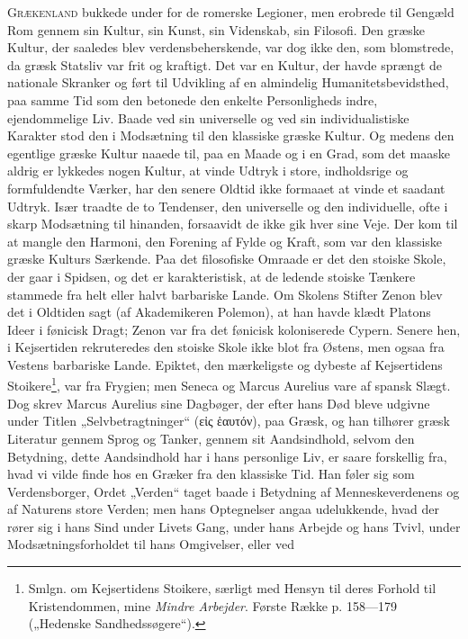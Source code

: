 \documentclass[12pt,a4paper,openany]{book}
\newcommand{\opage}[1]{\marginnote{\footnotesize\textit{[#1]}}}
\begin{document}
G\textsc{rækenland} bukkede under for de romerske Legioner,
men erobrede til Gengæld Rom gennem sin Kultur,
sin Kunst, sin Videnskab, sin Filosofi. Den græske Kultur,
der saaledes blev verdensbeherskende, var dog ikke den, som
blomstrede, da græsk Statsliv var frit og kraftigt. Det var en
Kultur, der havde sprængt de nationale Skranker og ført til
Udvikling af en almindelig Humanitetsbevidsthed, paa samme
Tid som den betonede den enkelte Personligheds indre, ejendommelige
Liv. Baade ved sin universelle og ved sin individualistiske
Karakter stod den i Modsætning til den klassiske
græske Kultur. Og medens den egentlige græske Kultur naaede
til, paa en Maade og i en Grad, som det maaske aldrig er
lykkedes nogen Kultur, at vinde Udtryk i store, indholdsrige
og formfuldendte Værker, har den senere Oldtid ikke formaaet
at vinde et saadant Udtryk. Især traadte de to Tendenser,
den universelle og den individuelle, ofte i skarp Modsætning
til hinanden, forsaavidt de ikke gik hver sine Veje. Der kom
til at mangle den Harmoni, den Forening af Fylde og Kraft,
som var den klassiske græske Kulturs Særkende. Paa det
filosofiske Omraade er det den stoiske Skole, der gaar i Spidsen,
og det er karakteristisk, at de ledende stoiske Tænkere stammede
fra helt eller halvt barbariske Lande. Om Skolens Stifter
\setcounter{footnote}{0}%
\opage{108}Zenon blev det i Oldtiden sagt (af Akademikeren Polemon), at
han havde klædt Platons Ideer i fønicisk Dragt; Zenon var fra
det fønicisk koloniserede Cypern. Senere hen, i Kejsertiden
rekruteredes den stoiske Skole ikke blot fra Østens, men ogsaa
fra Vestens barbariske Lande. Epiktet, den mærkeligste og
dybeste af Kejsertidens Stoikere\footnote[1]{Smlgn. om Kejsertidens Stoikere, særligt med Hensyn til deres Forhold til Kristendommen, mine \emph{Mindre Arbejder}. Første Række p. 158---179 („Hedenske Sandhedssøgere“).}, var fra Frygien; men Seneca
og Marcus Aurelius vare af spansk Slægt. Dog skrev Marcus
Aurelius sine Dagbøger, der efter hans Død bleve udgivne under
Titlen „Selvbetragtninger“ (εἰς ἑαυτόν), paa Græsk, og han tilhører
græsk Literatur gennem Sprog og Tanker, gennem sit
Aandsindhold, selvom den Betydning, dette Aandsindhold har
i hans personlige Liv, er saare forskellig fra, hvad vi vilde
finde hos en Græker fra den klassiske Tid. Han føler sig
som Verdensborger, Ordet „Verden“ taget baade i Betydning
af Menneskeverdenens og af Naturens store Verden; men hans
Optegnelser angaa udelukkende, hvad der rører sig i hans
Sind under Livets Gang, under hans Arbejde og hans Tvivl,
under Modsætningsforholdet til hans Omgivelser, eller ved
\end{document}
